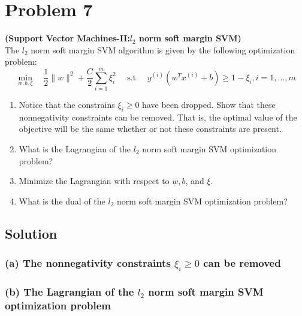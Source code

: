 \section*{Problem 7}

\textbf{(Support Vector Machines-II:\@ \( l_{2}
    \) norm soft margin SVM)}\\
The \( l_{2} \) norm soft margin SVM algorithm is given by the following optimization problem:
\[
    \min _{w, b, \xi} \quad \frac{1}{2}\|w\|^{2}+\frac{C}{2} \sum_{i=1}^{m} \xi_{i}^{2} \quad \text { s.t } \quad y^{(i)}\left(w^{T} x^{(i)}+b\right) \geq 1-\xi_{i}, i=1, \ldots, m
\]
\begin{enumerate}[label= (\alph*), noitemsep, topsep=0pt]
    \item Notice that the constrains \( \xi_{i} \geq 0 \) have been dropped.
          Show that these nonnegativity constraints can be removed.
          That is, the optimal value of the objective will be the same whether or not these constraints are present.

    \item What is the Lagrangian of the \( l_{2} \) norm soft margin SVM optimization problem?

    \item Minimize the Lagrangian with respect to \( w, b \), and \( \xi \).

    \item What is the dual of the \( l_{2} \) norm soft margin SVM optimization problem?
\end{enumerate}

\subsection*{Solution}

\subsubsection*{(a) The nonnegativity constraints \( \xi_{i} \geq 0 \) can be removed}

\subsubsection*{(b) The Lagrangian of the \( l_{2} \) norm soft margin SVM optimization problem}

